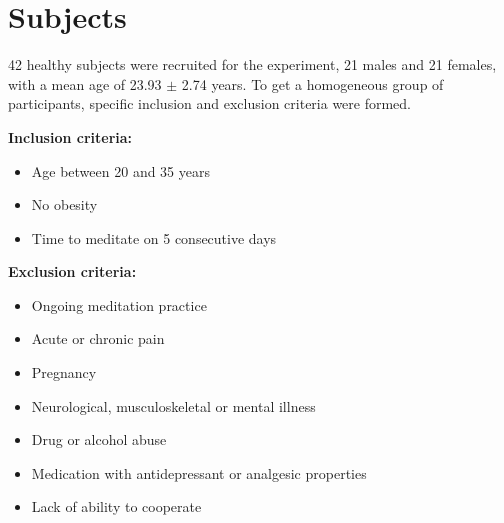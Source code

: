 

\section{Subjects}
42 healthy subjects were recruited for the experiment, 21 males and 21 females, with a mean age of 23.93 $\pm$ 2.74 years. To get a homogeneous group of participants, specific inclusion and exclusion criteria were formed.

\textbf{Inclusion criteria:}
\vspace{-.5cm}
\begin{itemize}
	\vspace{-.3cm}
	\item Age between 20 and 35 years
	\vspace{-.3cm}
	\item No obesity 
	\vspace{-.3cm}
	\item Time to meditate on 5 consecutive days
\end{itemize}

\textbf{Exclusion criteria:}
\vspace{-.5cm}
\begin{itemize}
	\item Ongoing meditation practice 
	\vspace{-.3cm}
	\item Acute or chronic pain
	\vspace{-.3cm}
	\item Pregnancy 
	\vspace{-.3cm}
	\item Neurological, musculoskeletal or mental illness
	\vspace{-.3cm}
	\item Drug or alcohol abuse
	\vspace{-.3cm}
	\item Medication with antidepressant or analgesic properties
	\vspace{-.3cm}
	\item Lack of ability to cooperate
\end{itemize}

